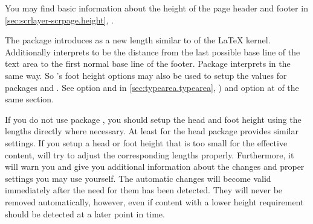 
\ifshortversion\IgnoreThisfalse{}\fi
\ifIgnoreThis %
You may find basic information about the height of the page header and footer
in \autoref{sec:scrlayer-scrpage.height},
.
\else %

\begin{Declaration}
\end{Declaration}
The package  introduces  as a new length
similar to  of the \LaTeX{} kernel. Additionally
 interprets  to be the distance
from the last possible base line of the text area to the first normal base
line of the footer. Package 
interprets  in the same way. So 's foot
height options may also be used to setup the values for packages
 and . See option
 and  in \autoref{sec:typearea.typearea},
) and option 
at  of the same section.

If you do not use package , you should setup the head and
foot height using the lengths directly where necessary. At least for the head
package  provides similar settings. If you setup a head or
foot height that is too small for the effective content,
 will try to adjust the corresponding lengths
properly. Furthermore, it will warn you and give you additional information
about the changes and proper settings you may use yourself. The automatic
changes will become valid immediately after the need for them has been
detected.  They will never be removed automatically, however, even if content
with a lower height requirement should be detected at a later point in time.%
\EndIndexGroup
%
\fi %

